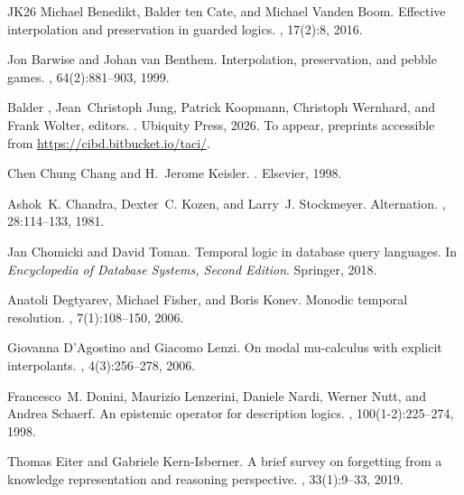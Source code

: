 \documentclass[10pt,a4paper]{amsart}
\theoremstyle{plain}
\theoremstyle{definition}
\begin{document}
\begin{thebibliography}{{}JK{\etalchar{+}}26}
Michael Benedikt, Balder ten Cate, and Michael {Vanden Boom}.
\newblock Effective interpolation and preservation in guarded logics.
, 17(2):8, 2016.

Jon Barwise and Johan van Benthem.
\newblock Interpolation, preservation, and pebble games.
, 64(2):881--903, 1999.

Balder {}, Jean~Christoph Jung, Patrick Koopmann, Christoph Wernhard, and Frank Wolter, editors.
.
\newblock Ubiquity Press, 2026.
\newblock To appear, preprints accessible from \url{https://cibd.bitbucket.io/taci/}.

{Chen Chung} Chang and H.~Jerome Keisler.
.
\newblock Elsevier, 1998.

Ashok~K. Chandra, Dexter~C. Kozen, and Larry~J. Stockmeyer.
\newblock Alternation.
, 28:114--133, 1981.

Jan Chomicki and David Toman.
\newblock Temporal logic in database query languages.
\newblock In {\em Encyclopedia of Database Systems, Second Edition}. Springer, 2018.

Anatoli Degtyarev, Michael Fisher, and Boris Konev.
\newblock Monodic temporal resolution.
, 7(1):108--150, 2006.

Giovanna D'Agostino and Giacomo Lenzi.
\newblock On modal mu-calculus with explicit interpolants.
, 4(3):256--278, 2006.

Francesco~M. Donini, Maurizio Lenzerini, Daniele Nardi, Werner Nutt, and Andrea Schaerf.
\newblock An epistemic operator for description logics.
, 100(1-2):225--274, 1998.

Thomas Eiter and Gabriele Kern{-}Isberner.
\newblock A brief survey on forgetting from a knowledge representation and reasoning perspective.
, 33(1):9--33, 2019.


\end{thebibliography}
\end{document}
